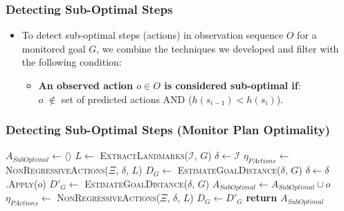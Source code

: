 \documentclass{beamer}
\begin{document}
\begin{frame}[c]\frametitle{Detecting Sub-Optimal Steps}

	\begin{itemize}
		\item To detect sub-optimal steps (actions) in observation sequence $O$ for a monitored goal $G$, we combine the techniques we developed and filter with the following condition:
			\begin{itemize}
            	\item \textbf{An observed action $o \in O$ is considered sub-optimal if}: \\ $o$ $\notin$ set of predicted actions AND ($h(s_{i-1}) < h(s_i)$).
			\end{itemize}  
	\end{itemize}
\end{frame}


\begin{frame}[c]\frametitle{Detecting Sub-Optimal Steps (Monitor Plan Optimality)}
    \begin{algorithmic}[1]
        		\State $A_{SubOptimal} \gets \langle\rangle$ 
        		\State $L \gets $ \textsc{ExtractLandmarks($\mathcal{I}$, $G$)}
			\State $\delta \gets \mathcal{I}$ 
			\State $\eta_{PActions} \gets $ \textsc{NonRegressiveActions}($\Xi$, $\delta$, $L$)
			\State $D_{G} \gets$ \textsc{EstimateGoalDistance}($\delta$, $G$)  
        			\State $\delta \gets \delta$.\textsc{Apply}($o$)
        			\State $D'_{G} \gets$ \textsc{EstimateGoalDistance}($\delta$, $G$)
        			\label{alg:monitor:estimatesuboptimalstep}
              		\State $A_{SubOptimal} \gets A_{SubOptimal} \cup o$
            		\EndIf
				\State $\eta_{PActions} \gets$ {\textsc{NonRegressiveActions}($\Xi$, $\delta$, $L$)}
        			\State $D_{G} \gets D'_{G}$
        		\EndFor
        		\State \textbf{return} $A_{SubOptimal}$
        \EndFunction
    \end{algorithmic}
\end{frame}
	
\end{document}
